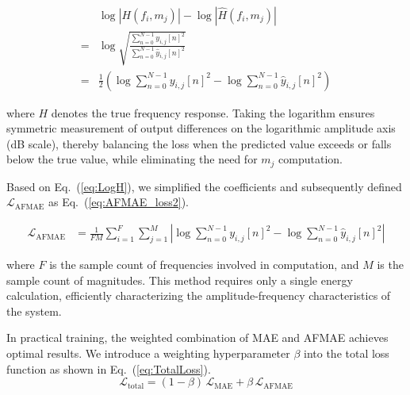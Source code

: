 \documentclass[journal]{IEEEtran}
\newcommand{\magn}{m} %
\newcommand{\fidx}{i} %
\newcommand{\fmax}{F} %
\newcommand{\midx}{j} %
\newcommand{\mmax}{M} %
\newcommand{\pidx}{n} %
\newcommand{\pmax}{N} %
\newcommand{\wMAE}{\beta} %
\newcommand{\pred}[1]{\hat{#1}} %
\begin{document}
          \begin{equation}
              \begin{aligned}
                    & \log  \left|H(f_\fidx,\magn_\midx)\right|  - \log\left|\pred{H}(f_\fidx, \magn_\midx)\right|                                            \\
                  = & \log \sqrt{\frac{\sum_{\pidx=0}^{\pmax-1}y_{\fidx,\midx}[n]^2}{{\sum_{\pidx=0}^{\pmax-1}\hat{y}_{\fidx,\midx}[n]^2}}}                   \\
                  = & \frac{1}{2} \left( \log \sum_{\pidx=0}^{\pmax-1}y_{\fidx,\midx}[n]^2 -  \log \sum_{\pidx=0}^{\pmax-1}\hat{y}_{\fidx,\midx}[n]^2 \right)
              \end{aligned}
              \label{eq:LogH}
          \end{equation}

          
          where $H$ denotes the true frequency response. Taking the logarithm ensures symmetric measurement of output differences on the logarithmic amplitude axis (dB scale), thereby balancing the loss when the predicted value exceeds or falls below the true value, while eliminating the need for $\magn_\midx$ computation.


          
          Based on Eq.~(\ref{eq:LogH}), we simplified the coefficients and subsequently defined $\mathcal{L}_{\text{AFMAE}}$ as Eq.~(\ref{eq:AFMAE_loss2}).


          \begin{equation}
              \begin{aligned}
                  \mathcal{L}_{\text{AFMAE}} & =  \frac{1}{\fmax\mmax} \sum_{\fidx=1}^{\fmax} \sum_{\midx=1}^{\mmax}
                  \left|
                  \log \sum_{\pidx=0}^{\pmax-1}y_{\fidx,\midx}[n]^2
                  - \log \sum_{\pidx=0}^{\pmax-1}\hat{y}_{\fidx,\midx}[n]^2
                  \right|
              \end{aligned}
              \label{eq:AFMAE_loss2}
          \end{equation}


where $\fmax$ is the sample count of frequencies involved in computation, and $\mmax$ is the sample count of magnitudes. This method requires only a single energy calculation, efficiently characterizing the amplitude-frequency characteristics of the system.

In practical training, the weighted combination of MAE and AFMAE achieves optimal results. We introduce a weighting hyperparameter $\wMAE$ into the total loss function as shown in Eq.~(\ref{eq:TotalLoss}).
\begin{equation}
    \mathcal{L}_{\text{total}}
    = (1-\wMAE)\,\mathcal{L}_{\text{MAE}}
    + \wMAE\,\mathcal{L}_{\text{AFMAE}}
    \label{eq:TotalLoss}
\end{equation}
\end{document}
